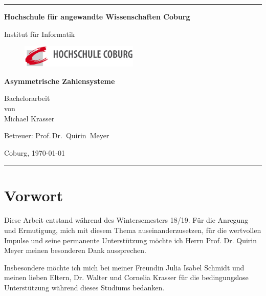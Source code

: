 \documentclass[a4paper,12pt]{article}
\begin{document}
\begin{titlepage}
\thispagestyle{empty} \enlargethispage{1.4in}

\begin{center}

\rule[1ex]{157.5mm}{0.5mm}

\LARGE\bf Hochschule für angewandte Wissenschaften Coburg\\

\vfill

\rm Institut für Informatik


\begin{figure}
	    \centering
				     \includegraphics[width=0.5\textwidth]{Logo.png}
\end{figure}

\vfill

\Huge \bf Asymmetrische Zahlensysteme

\vfill

\Large Bachelorarbeit \\ [1ex] von \\ [1ex]
Michael Krasser

\vfill

Betreuer:  Prof.\,Dr.~Quirin~Meyer

\vfill

Coburg, \today

\rule[-1ex]{157.5mm}{0.5mm}

\vfill

\end{center}

\end{titlepage}
\newpage
\section*{Vorwort}
Diese Arbeit entstand während des Wintersemesters 18/19. Für die Anregung und Ermutigung, mich mit diesem Thema auseinanderzusetzen, für die wertvollen Impulse und seine permanente Unterstützung möchte ich Herrn Prof. Dr. Quirin Meyer meinen besonderen Dank aussprechen.
\par
\vspace{5mm}
\par
Insbesondere möchte ich mich bei meiner Freundin Julia Isabel Schmidt und meinen lieben Eltern, Dr. Walter und Cornelia Krasser für die bedingungslose Unterstützung während dieses Studiums bedanken.
\pagebreak
\end{document}
